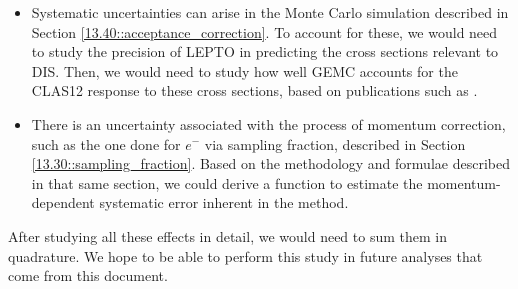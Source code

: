 \begin{itemize}
        \item
            Systematic uncertainties can arise in the Monte Carlo simulation described in Section \ref{13.40::acceptance_correction}.
            To account for these, we would need to study the precision of LEPTO in predicting the cross sections relevant to DIS.
            Then, we would need to study how well GEMC accounts for the CLAS12 response to these cross sections, based on publications such as \cite{ungaro2020gemc}.

        \item
            There is an uncertainty associated with the process of momentum correction, such as the one done for $e^-$ via sampling fraction, described in Section \ref{13.30::sampling_fraction}.
            Based on the methodology and formulae described in that same section, we could derive a function to estimate the momentum-dependent systematic error inherent in the method.
    \end{itemize}

    After studying all these effects in detail, we would need to sum them in quadrature.
    We hope to be able to perform this study in future analyses that come from this document.
